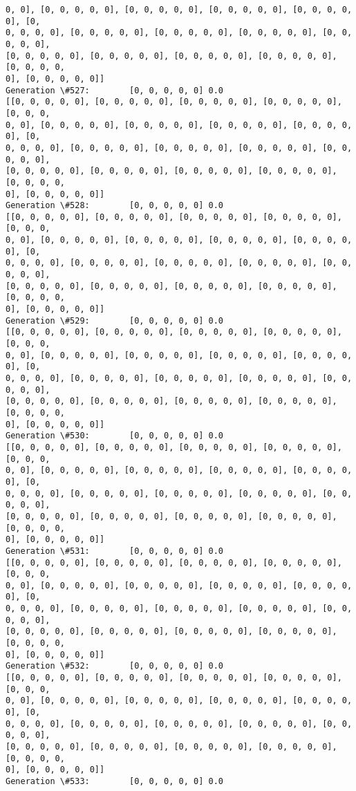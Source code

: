 \documentclass[11pt]{article}
\begin{document}
\begin{Verbatim}[commandchars=\\\{\}]
0, 0], [0, 0, 0, 0, 0], [0, 0, 0, 0, 0], [0, 0, 0, 0, 0], [0, 0, 0, 0, 0], [0,
0, 0, 0, 0], [0, 0, 0, 0, 0], [0, 0, 0, 0, 0], [0, 0, 0, 0, 0], [0, 0, 0, 0, 0],
[0, 0, 0, 0, 0], [0, 0, 0, 0, 0], [0, 0, 0, 0, 0], [0, 0, 0, 0, 0], [0, 0, 0, 0,
0], [0, 0, 0, 0, 0]]
Generation \#527:        [0, 0, 0, 0, 0] 0.0
[[0, 0, 0, 0, 0], [0, 0, 0, 0, 0], [0, 0, 0, 0, 0], [0, 0, 0, 0, 0], [0, 0, 0,
0, 0], [0, 0, 0, 0, 0], [0, 0, 0, 0, 0], [0, 0, 0, 0, 0], [0, 0, 0, 0, 0], [0,
0, 0, 0, 0], [0, 0, 0, 0, 0], [0, 0, 0, 0, 0], [0, 0, 0, 0, 0], [0, 0, 0, 0, 0],
[0, 0, 0, 0, 0], [0, 0, 0, 0, 0], [0, 0, 0, 0, 0], [0, 0, 0, 0, 0], [0, 0, 0, 0,
0], [0, 0, 0, 0, 0]]
Generation \#528:        [0, 0, 0, 0, 0] 0.0
[[0, 0, 0, 0, 0], [0, 0, 0, 0, 0], [0, 0, 0, 0, 0], [0, 0, 0, 0, 0], [0, 0, 0,
0, 0], [0, 0, 0, 0, 0], [0, 0, 0, 0, 0], [0, 0, 0, 0, 0], [0, 0, 0, 0, 0], [0,
0, 0, 0, 0], [0, 0, 0, 0, 0], [0, 0, 0, 0, 0], [0, 0, 0, 0, 0], [0, 0, 0, 0, 0],
[0, 0, 0, 0, 0], [0, 0, 0, 0, 0], [0, 0, 0, 0, 0], [0, 0, 0, 0, 0], [0, 0, 0, 0,
0], [0, 0, 0, 0, 0]]
Generation \#529:        [0, 0, 0, 0, 0] 0.0
[[0, 0, 0, 0, 0], [0, 0, 0, 0, 0], [0, 0, 0, 0, 0], [0, 0, 0, 0, 0], [0, 0, 0,
0, 0], [0, 0, 0, 0, 0], [0, 0, 0, 0, 0], [0, 0, 0, 0, 0], [0, 0, 0, 0, 0], [0,
0, 0, 0, 0], [0, 0, 0, 0, 0], [0, 0, 0, 0, 0], [0, 0, 0, 0, 0], [0, 0, 0, 0, 0],
[0, 0, 0, 0, 0], [0, 0, 0, 0, 0], [0, 0, 0, 0, 0], [0, 0, 0, 0, 0], [0, 0, 0, 0,
0], [0, 0, 0, 0, 0]]
Generation \#530:        [0, 0, 0, 0, 0] 0.0
[[0, 0, 0, 0, 0], [0, 0, 0, 0, 0], [0, 0, 0, 0, 0], [0, 0, 0, 0, 0], [0, 0, 0,
0, 0], [0, 0, 0, 0, 0], [0, 0, 0, 0, 0], [0, 0, 0, 0, 0], [0, 0, 0, 0, 0], [0,
0, 0, 0, 0], [0, 0, 0, 0, 0], [0, 0, 0, 0, 0], [0, 0, 0, 0, 0], [0, 0, 0, 0, 0],
[0, 0, 0, 0, 0], [0, 0, 0, 0, 0], [0, 0, 0, 0, 0], [0, 0, 0, 0, 0], [0, 0, 0, 0,
0], [0, 0, 0, 0, 0]]
Generation \#531:        [0, 0, 0, 0, 0] 0.0
[[0, 0, 0, 0, 0], [0, 0, 0, 0, 0], [0, 0, 0, 0, 0], [0, 0, 0, 0, 0], [0, 0, 0,
0, 0], [0, 0, 0, 0, 0], [0, 0, 0, 0, 0], [0, 0, 0, 0, 0], [0, 0, 0, 0, 0], [0,
0, 0, 0, 0], [0, 0, 0, 0, 0], [0, 0, 0, 0, 0], [0, 0, 0, 0, 0], [0, 0, 0, 0, 0],
[0, 0, 0, 0, 0], [0, 0, 0, 0, 0], [0, 0, 0, 0, 0], [0, 0, 0, 0, 0], [0, 0, 0, 0,
0], [0, 0, 0, 0, 0]]
Generation \#532:        [0, 0, 0, 0, 0] 0.0
[[0, 0, 0, 0, 0], [0, 0, 0, 0, 0], [0, 0, 0, 0, 0], [0, 0, 0, 0, 0], [0, 0, 0,
0, 0], [0, 0, 0, 0, 0], [0, 0, 0, 0, 0], [0, 0, 0, 0, 0], [0, 0, 0, 0, 0], [0,
0, 0, 0, 0], [0, 0, 0, 0, 0], [0, 0, 0, 0, 0], [0, 0, 0, 0, 0], [0, 0, 0, 0, 0],
[0, 0, 0, 0, 0], [0, 0, 0, 0, 0], [0, 0, 0, 0, 0], [0, 0, 0, 0, 0], [0, 0, 0, 0,
0], [0, 0, 0, 0, 0]]
Generation \#533:        [0, 0, 0, 0, 0] 0.0

\end{Verbatim}
\end{document}
